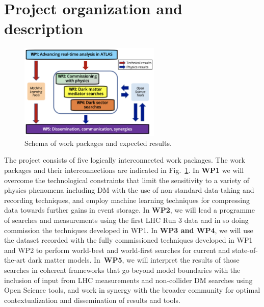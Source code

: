 \documentclass[11pt,a4paper]{article}
\begin{document}

\section{Project organization and description} 
\smallskip


\begin{figure} 
\begin{center}
\includegraphics[width=0.6\textwidth]{figs/WPs_shorter}
\caption{\label{fig:WPs} \footnotesize Schema of work packages and expected results.
}
\end{center}

\vskip10pt
\end{figure}

The project consists of five logically interconnected work packages.
The work packages and their interconnections are indicated in Fig.~\ref{fig:WPs}. 
In \textbf{WP1} we will overcome the technological constraints that limit the sensitivity to a variety of physics phenomena including DM with the use of non-standard data-taking and recording techniques, and employ machine learning techniques for compressing data towards further gains in event storage.  
In \textbf{WP2}, we will lead a programme of searches and measurements using the first LHC Run 3 data and in so doing commission the techniques developed in WP1. 
In \textbf{WP3 and WP4}, we will use the dataset recorded with the fully commissioned techniques developed in WP1 and WP2 to perform world-best and world-first searches for current and state-of-the-art dark matter models. 
In~\textbf{WP5}, we will interpret the results of those searches in coherent frameworks that go beyond model boundaries with the inclusion of input from LHC measurements and non-collider DM searches using Open Science tools, and work in synergy with the broader community for optimal contextualization and dissemination of results and tools. %
\end{document}
